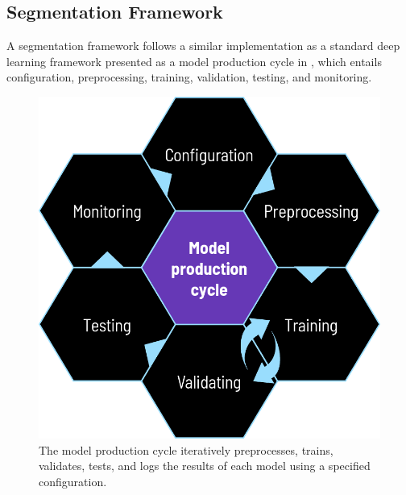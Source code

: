\subsection{Segmentation Framework}
\label{subsec:segmentation_framework}
A segmentation framework follows a similar implementation as a standard deep learning framework presented as a model production cycle in , which entails configuration, preprocessing, training, validation, testing, and monitoring.
\begin{figure}[H]%
    \centering
    \includegraphics[width=\imgWidthM]{images/model_production_cycle.png}
    \caption[Experimental setup]{The model production cycle iteratively preprocesses, trains, validates, tests, and logs the results of each model using a specified configuration.}
    \label{model_production_cycle}
\end{figure}

